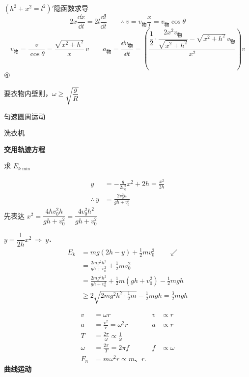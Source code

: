 $(h^{2}+x^{2}=l^{2})'$\quad 隐函数求导
\[
2x\frac{\dd x}{\dd t}=2l\frac{\dd l}{\dd t}\qquad \therefore\ v=v_{\text{物}}\frac{x}{l}=v_{\text{物}}\cos\theta
\]
\[
v_{\text{物}}=\frac{v}{\cos\theta}=\frac{\sqrt{x^{2}+h^{2}}}{x}\,v
\qquad
a_{\text{物}}=\frac{\dd v_{\text{物}}}{\dd t}=\left(\frac{\dfrac{1}{2}\cdot\dfrac{2x^{2}v_{\text{物}}}{\sqrt{x^{2}+h^{2}}}-\sqrt{x^{2}+h^{2}}\,v_{\text{物}}}{x^{2}}\right)v
\]
④

要衣物内壁则，$\omega\ge\sqrt{\dfrac{g}{R}}$

匀速圆周运动

洗衣机
\begin{problem}
\textbf{交用轨迹方程}


求 $E_{k\min}$
\begin{solution}
\begin{align*}
y&=-\frac{g}{2v_0^2}x^2+2h=\frac{x^2}{2h}\\
\therefore\ y&=\frac{2v_0^2h}{gh+v_0^2}
\end{align*}
先表达 $x^2=\dfrac{4hv_0^2h}{gh+v_0^2}=\dfrac{4v_0^2h^2}{gh+v_0^2}$

\quad $y=\dfrac{1}{2h}x^2\ \Rightarrow\ y$．
\begin{align*}
E_k&=mg(2h-y)+\frac{1}{2}mv_0^2\qquad\swarrow\\
&=\frac{2mg^2h^2}{gh+v_0^2}+\frac{1}{2}mv_0^2\\
&=\frac{2mg^2h^2}{gh+v_0^2}+\frac{1}{2}m(gh+v_0^2)-\frac{1}{2}mgh\\
&\ge2\sqrt{2mg^2h^2\cdot\frac{1}{2}m}-\frac{1}{2}mgh=\frac{3}{2}mgh
\end{align*}
\end{solution}
\end{problem}
\begin{align*}
v&=\omega r & v&\propto r\\
a&=\frac{v^2}{r}=\omega^2 r & a&\propto r\\
T&=\frac{2\pi}{\omega}\propto\frac{1}{\omega}\\
\omega&=\frac{2\pi}{T}=2\pi f & f&\propto\omega\\
F_n&=m\omega^2 r\propto m\text{、}r.
\end{align*}
\textbf{曲线运动}

